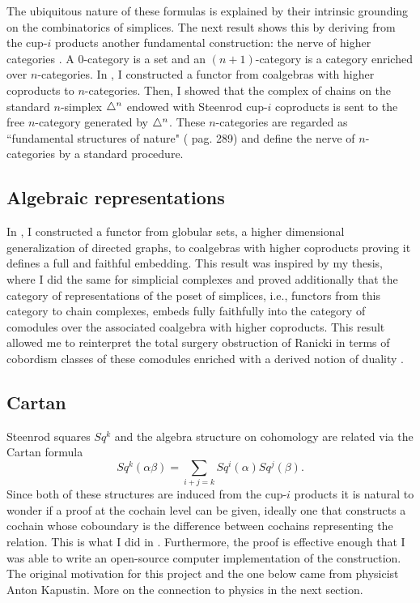 The ubiquitous nature of these formulas is explained by their intrinsic grounding on the combinatorics of simplices.
The next result shows this by deriving from the cup-$i$ products another fundamental construction: the nerve of higher categories \cite{street1987orientals}.
A $0$-category is a set and an $(n+1)$-category is a category enriched over $n$-categories.
In \cite{medina2020globular}, I constructed a functor from coalgebras with higher coproducts to $n$-categories.
Then, I showed that the complex of chains on the standard $n$-simplex $\triangle^n$ endowed with Steenrod cup-$i$ coproducts is sent to the free $n$-category generated by $\triangle^n$.
These $n$-categories are regarded as ``fundamental structures of nature" (\cite{street1987orientals} pag. 289) and define the nerve of $n$-categories by a standard procedure.

\subsection{Algebraic representations}

In \cite{medina2020globular}, I constructed a functor from globular sets, a higher dimensional generalization of directed graphs, to coalgebras with higher coproducts proving it defines a full and faithful embedding.
This result was inspired by my thesis, where I did the same for simplicial complexes and proved additionally that the category of representations of the poset of simplices, i.e., functors from this category to chain complexes, embeds fully faithfully into the category of comodules over the associated coalgebra with higher coproducts.
This result allowed me to reinterpret the total surgery obstruction of Ranicki \cite{ranicki1992topological} in terms of cobordism classes of these comodules enriched with a derived notion of duality \cite{medina2015thesis}.

\subsection{Cartan} \label{ss:cartan}

Steenrod squares $Sq^k$ and the algebra structure on cohomology are related via the Cartan formula
\begin{equation*}
Sq^k(\alpha \beta) = \sum_{i+j=k} Sq^i(\alpha) Sq^j(\beta).
\end{equation*}
Since both of these structures are induced from the cup-$i$ products it is natural to wonder if a proof at the cochain level can be given, ideally one that constructs a cochain whose coboundary is the difference between cochains representing the relation.
This is what I did in \cite{medina2020cartan}.
Furthermore, the proof is effective enough that I was able to write an open-source computer implementation of the construction.
The original motivation for this project and the one below came from physicist Anton Kapustin.
More on the connection to physics in the next section.


